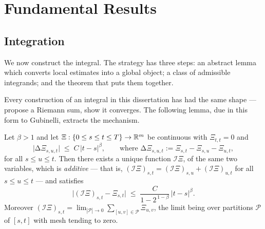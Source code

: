 
\section{Fundamental Results}\label{sec:fundamentalresults}

\subsection{Integration}\label{subsec:roughintegration}

We now construct the integral. The strategy has three steps: an abstract lemma which converts local
estimates into a global object; a class of admissible integrands; and the theorem that puts them
together.

\medskip

Every construction of an integral in this dissertation has had
the same shape --- propose a Riemann sum, show it converges. The following lemma, due in this form
to Gubinelli, extracts the mechanism.

\begin{lemma}\label{lem:sewing}
Let $\beta > 1$ and let $\Xi : \{0 \leq s \leq t \leq T\} \to \mathbb{R}^m$ be continuous with
$\Xi_{t,t}=0$ and
\begin{equation}\label{eq:sewinghypothesis}
\bigl| \increment{\Xi}_{s,u,t} \bigr| \;\leq\; C\,|t-s|^{\beta}, \qquad \text{where }
\increment{\Xi}_{s,u,t} := \Xi_{s,t} - \Xi_{s,u} - \Xi_{u,t},
\end{equation}
for all $s\leq u\leq t$. Then there exists a unique function $\mathcal{I}\Xi$, of the same two
variables, which is \emph{additive} --- that is, $(\mathcal{I}\Xi)_{s,t} = (\mathcal{I}\Xi)_{s,u} +
(\mathcal{I}\Xi)_{u,t}$ for all $s\leq u\leq t$ --- and satisfies
\begin{equation}\label{eq:sewingconclusion}
\bigl| (\mathcal{I}\Xi)_{s,t} - \Xi_{s,t} \bigr| \;\leq\; \frac{C}{1 - 2^{\,1-\beta}}\,|t-s|^{\beta}.
\end{equation}
Moreover $(\mathcal{I}\Xi)_{s,t} = \lim_{|\mathcal{P}|\to0}\sum_{[u,v]\in\mathcal{P}} \Xi_{u,v}$,
the limit being over partitions $\mathcal{P}$ of $[s,t]$ with mesh tending to zero.
\end{lemma}

